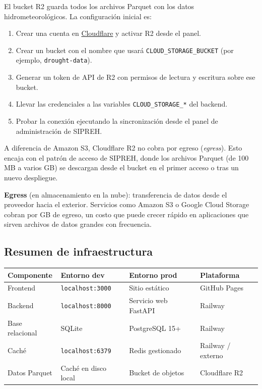El bucket R2 guarda todos los archivos Parquet con los datos hidrometeorológicos. La configuración inicial es:

\begin{enumerate}
    \item Crear una cuenta en \href{https://www.cloudflare.com/}{Cloudflare} y activar R2 desde el panel.
    \item Crear un bucket con el nombre que usará \texttt{CLOUD\_STORAGE\_BUCKET} (por ejemplo, \texttt{drought-data}).
    \item Generar un token de API de R2 con permisos de lectura y escritura sobre ese bucket.
    \item Llevar las credenciales a las variables \texttt{CLOUD\_STORAGE\_*} del backend.
    \item Probar la conexión ejecutando la sincronización desde el panel de administración de SIPREH.
\end{enumerate}

\begin{remark}
A diferencia de Amazon S3, Cloudflare R2 no cobra por egreso (\textit{egress}). Esto encaja con el patrón de acceso de SIPREH, donde los archivos Parquet (de 100 MB a varios GB) se descargan desde el bucket en el primer acceso o tras un nuevo despliegue.
\end{remark}

\begin{definition}
\textbf{Egress} (en almacenamiento en la nube): transferencia de datos desde el proveedor hacia el exterior. Servicios como Amazon S3 o Google Cloud Storage cobran por GB de egreso, un costo que puede crecer rápido en aplicaciones que sirven archivos de datos grandes con frecuencia.
\end{definition}

\subsection*{Resumen de infraestructura}

\begin{center}
\begin{tabular}{@{}llll@{}}
\toprule
\textbf{Componente} & \textbf{Entorno dev} & \textbf{Entorno prod} & \textbf{Plataforma} \\
\midrule
Frontend       & \texttt{localhost:3000} & Sitio estático        & GitHub Pages \\
Backend        & \texttt{localhost:8000} & Servicio web FastAPI  & Railway \\
Base relacional& SQLite                  & PostgreSQL 15+        & Railway \\
Caché          & \texttt{localhost:6379} & Redis gestionado      & Railway / externo \\
Datos Parquet  & Caché en disco local    & Bucket de objetos     & Cloudflare R2 \\
\bottomrule
\end{tabular}
\end{center}
